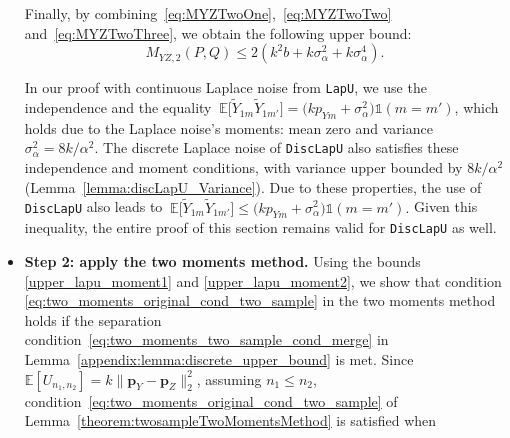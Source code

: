 \documentclass[twoside,11pt]{article}
\newcommand{\rvTwo}{Y}
\newcommand{\rvThree}{Z}
\newcommand{\mE}{\mathbb{E}} %
\newcommand{\alphabetSize}{k} %
\newcommand{\vectorIndex}{m}
\newcommand{\sampleSize}{n}
\newcommand{\probVecElement}[2]{p_{{#1}{#2}}}
\newcommand{\probVec}{\mathbf{p}} %
\newcommand{\kernelMoment}{M} %
\newcommand{\dataGenDist}{P}  %
\newcommand{\privacyMechanism}{Q}
\newcommand{\privacyParameter}{\alpha} %
\newcommand{\LapUParam}{\sigma_{\privacyParameter}}
\newcommand{\momentTwosampleExpSquare}{\kernelMoment_{\rvTwo \rvThree,2}(\dataGenDist, \privacyMechanism)}
\begin{document}
\begin{appendix}
\begin{itemize}
	Finally, by combining~\eqref{eq:MYZTwoOne},~\eqref{eq:MYZTwoTwo} and~\eqref{eq:MYZTwoThree}, we obtain the following upper bound:
	\begin{equation}\label{upper_lapu_moment2}
		\momentTwosampleExpSquare
		\leq
		2
		(
		{\alphabetSize}^2
		{b} 
		+
		{\alphabetSize} \LapUParam^2
		+
		{\alphabetSize} \LapUParam^4	
		).
	\end{equation}
	\begin{remark} \label{remark: discrete laplace noise}
		In our proof with continuous Laplace noise from \textnormal{\texttt{LapU}},  we use the independence and the equality  
		$\
		\mE
		\bigl[
		\tilde{\rvTwo}_{1 \vectorIndex}
		\tilde{\rvTwo}_{1 \vectorIndex'}
		\bigr]
		=
		\bigl(
		{\alphabetSize}\probVecElement{\rvTwo}{\vectorIndex} + \LapUParam^2
		\bigr)
		\mathds{1}(\vectorIndex = \vectorIndex')$,
		which holds due to the Laplace noise's moments: mean zero and variance $\sigma_\alpha^2 = 8k/\alpha^2$. The discrete Laplace noise of \textnormal{\texttt{DiscLapU}} also satisfies these independence and moment conditions, with variance upper bounded by $8 \alphabetSize/\privacyParameter^2$ (Lemma~\ref{lemma:discLapU_Variance}).
		Due to these properties, the use of \textnormal{\texttt{DiscLapU}} also leads to
		$\
		\mE
		\bigl[
		\tilde{\rvTwo}_{1 \vectorIndex}
		\tilde{\rvTwo}_{1 \vectorIndex'}
		\bigr]
		\leq
		\bigl(
		{\alphabetSize}\probVecElement{\rvTwo}{\vectorIndex} + \LapUParam^2
		\bigr)
		\mathds{1}(\vectorIndex = \vectorIndex').$
		Given this inequality, the entire proof of this section remains valid for \textnormal{\texttt{DiscLapU}} as well.
	\end{remark}
	\item \textbf{Step 2: apply the two moments method.}\label{proof:twosample_upper_disc_conclusion}
	Using the bounds \eqref{upper_lapu_moment1} and \eqref{upper_lapu_moment2},  we show that condition \eqref{eq:two_moments_original_cond_two_sample} in the two moments method holds if the separation condition~\eqref{eq:two_moments_two_sample_cond_merge} in Lemma~\ref{appendix:lemma:discrete_upper_bound} is met.
	Since $\mE [U_{\sampleSize_1, \sampleSize_2}] = \alphabetSize \| \probVec_\rvTwo - \probVec_\rvThree \|_2^2$, assuming $\sampleSize_1 \leq \sampleSize_2$, condition~\eqref{eq:two_moments_original_cond_two_sample} of Lemma~\ref{theorem:twosampleTwoMomentsMethod} is satisfied when
	\begin{align*}

\end{align*}
\end{itemize}
\end{appendix}
\end{document}
